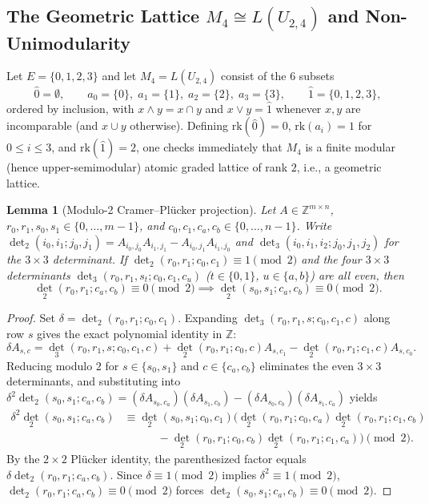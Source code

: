 \documentclass[11pt]{article}
\newtheorem{lemma}[theorem]{Lemma}
\theoremstyle{definition}
\theoremstyle{remark}
\newcommand{\rk}{\mathrm{rk}}
\newcommand{\Z}{\mathbb{Z}}
\begin{document}
\subsection{The Geometric Lattice \texorpdfstring{$M_4 \cong L(U_{2,4})$}{M4 = L(U(2,4))} and Non-Unimodularity}

Let $E = \{0, 1, 2, 3\}$ and let $M_4 = L(U_{2,4})$ consist of the $6$ subsets
\[
  \hat{0} = \emptyset, \qquad
  a_0 = \{0\},\; a_1 = \{1\},\; a_2 = \{2\},\; a_3 = \{3\}, \qquad
  \hat{1} = \{0, 1, 2, 3\},
\]
ordered by inclusion, with $x \wedge y = x \cap y$ and $x \vee y = \hat{1}$ whenever $x, y$ are
incomparable (and $x \cup y$ otherwise). Defining $\rk(\hat{0}) = 0$, $\rk(a_i) = 1$ for
$0 \le i \le 3$, and $\rk(\hat{1}) = 2$, one checks immediately that $M_4$ is a finite modular
(hence upper-semimodular) atomic graded lattice of rank $2$, i.e., a geometric lattice.

\begin{lemma}[Modulo-2 Cramer--Pl\"ucker projection]
\label{lem:cramer-plucker}
Let $A \in \Z^{m \times n}$, $r_0, r_1, s_0, s_1 \in \{0, \dots, m-1\}$, and
$c_0, c_1, c_a, c_b \in \{0, \dots, n-1\}$. Write $\det_2(i_0, i_1; j_0, j_1) =
A_{i_0, j_0} A_{i_1, j_1} - A_{i_0, j_1} A_{i_1, j_0}$ and $\det_3(i_0, i_1, i_2; j_0, j_1, j_2)$
for the $3 \times 3$ determinant. If $\det_2(r_0, r_1; c_0, c_1) \equiv 1 \pmod{2}$ and the four
$3 \times 3$ determinants $\det_3(r_0, r_1, s_t; c_0, c_1, c_u)$ ($t \in \{0,1\}$,
$u \in \{a,b\}$) are all even, then
\[
  \det_2(r_0, r_1; c_a, c_b) \equiv 0 \pmod{2} \implies
  \det_2(s_0, s_1; c_a, c_b) \equiv 0 \pmod{2}.
\]
\end{lemma}

\begin{proof}
Set $\delta = \det_2(r_0, r_1; c_0, c_1)$. Expanding $\det_3(r_0, r_1, s; c_0, c_1, c)$ along row
$s$ gives the exact polynomial identity in $\Z$:
\[
  \delta A_{s, c} = \det_3(r_0, r_1, s; c_0, c_1, c)
    + \det_2(r_0, r_1; c_0, c) A_{s, c_1} - \det_2(r_0, r_1; c_1, c) A_{s, c_0}.
\]
Reducing modulo $2$ for $s \in \{s_0, s_1\}$ and $c \in \{c_a, c_b\}$ eliminates the even
$3 \times 3$ determinants, and substituting into $\delta^2 \det_2(s_0, s_1; c_a, c_b) =
(\delta A_{s_0, c_a})(\delta A_{s_1, c_b}) - (\delta A_{s_0, c_b})(\delta A_{s_1, c_a})$ yields
\[
\begin{aligned}
  \delta^2 \det_2(s_0, s_1; c_a, c_b)
  &\equiv \det_2(s_0, s_1; c_0, c_1) \bigl(\det_2(r_0, r_1; c_0, c_a)\det_2(r_0, r_1; c_1, c_b) \\
  &\qquad\quad - \det_2(r_0, r_1; c_0, c_b)\det_2(r_0, r_1; c_1, c_a)\bigr) \pmod{2}.
\end{aligned}
\]
By the $2 \times 2$ Pl\"ucker identity, the parenthesized factor equals
$\delta \det_2(r_0, r_1; c_a, c_b)$. Since $\delta \equiv 1 \pmod{2}$ implies
$\delta^2 \equiv 1 \pmod{2}$, $\det_2(r_0, r_1; c_a, c_b) \equiv 0 \pmod{2}$ forces
$\det_2(s_0, s_1; c_a, c_b) \equiv 0 \pmod{2}$.
\end{proof}
\end{document}
